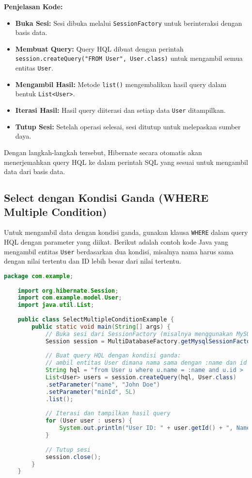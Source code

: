 \textbf{Penjelasan Kode:}
\begin{itemize}
	\item \textbf{Buka Sesi:} Sesi dibuka melalui \texttt{SessionFactory} untuk berinteraksi dengan basis data.
	\item \textbf{Membuat Query:} Query HQL dibuat dengan perintah \texttt{session.createQuery("FROM User", User.class)} untuk mengambil semua entitas \texttt{User}.
	\item \textbf{Mengambil Hasil:} Metode \texttt{list()} mengembalikan hasil query dalam bentuk \texttt{List<User>}.
	\item \textbf{Iterasi Hasil:} Hasil query diiterasi dan setiap data \texttt{User} ditampilkan.
	\item \textbf{Tutup Sesi:} Setelah operasi selesai, sesi ditutup untuk melepaskan sumber daya.
\end{itemize}

Dengan langkah-langkah tersebut, Hibernate secara otomatis akan menerjemahkan query HQL ke dalam perintah SQL yang sesuai untuk mengambil data dari basis data.

\subsection{Select dengan Kondisi Ganda (WHERE Multiple Condition)}

Untuk mengambil data dengan kondisi ganda, gunakan klausa \texttt{WHERE} dalam query HQL dengan parameter yang diikat. Berikut adalah contoh kode Java yang mengambil entitas \texttt{User} berdasarkan dua kondisi, misalnya nama harus sama dengan nilai tertentu dan ID lebih besar dari nilai tertentu.

\begin{lstlisting}[language=Java, style=JavaStyle]
	package com.example;
	
	import org.hibernate.Session;
	import com.example.model.User;
	import java.util.List;
	
	public class SelectMultipleConditionExample {
		public static void main(String[] args) {
			// Buka sesi dari SessionFactory (misalnya menggunakan MySQL)
			Session session = MultiDatabaseFactory.getMysqlSessionFactory().openSession();
			
			// Buat query HQL dengan kondisi ganda: 
			// ambil entitas User dimana nama sama dengan :name dan id lebih besar dari :minId
			String hql = "from User u where u.name = :name and u.id > :minId";
			List<User> users = session.createQuery(hql, User.class)
			.setParameter("name", "John Doe")
			.setParameter("minId", 5L)
			.list();
			
			// Iterasi dan tampilkan hasil query
			for (User user : users) {
				System.out.println("User ID: " + user.getId() + ", Name: " + user.getName());
			}
			
			// Tutup sesi
			session.close();
		}
	}
\end{lstlisting}

